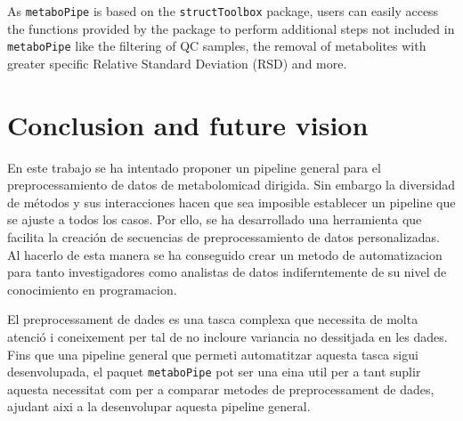 \documentclass[ENG, BIB]{TFUOC}%
\begin{document}
As \texttt{metaboPipe} is based on the \texttt{structToolbox} package, users can easily access the functions provided by the package to perform additional steps not included in \texttt{metaboPipe} like the filtering of QC samples, the removal of metabolites with greater specific Relative Standard Deviation (RSD) and more.




\chapter{Conclusion and future vision}

En este trabajo se ha intentado proponer un pipeline general para el preprocessamiento de datos de metabolomicad dirigida. Sin embargo la diversidad de métodos y sus interacciones hacen que sea imposible establecer un pipeline que se ajuste a todos los casos. Por ello, se ha desarrollado una herramienta que facilita la creación de secuencias de preprocessamiento de datos personalizadas. Al hacerlo de esta manera se ha conseguido crear un metodo de automatizacion para tanto investigadores como analistas de datos indiferntemente de su nivel de conocimiento en programacion.

El preprocessament de dades es una tasca complexa que necessita de molta atenció i coneixement per tal de no incloure variancia no dessitjada en les dades. Fins que una pipeline general que permeti automatitzar aquesta tasca sigui desenvolupada, el paquet \texttt{metaboPipe} pot ser una eina util per a tant suplir aquesta necessitat com per a comparar metodes de preprocessament de dades, ajudant aixi a la desenvolupar aquesta pipeline general.
\end{document}
